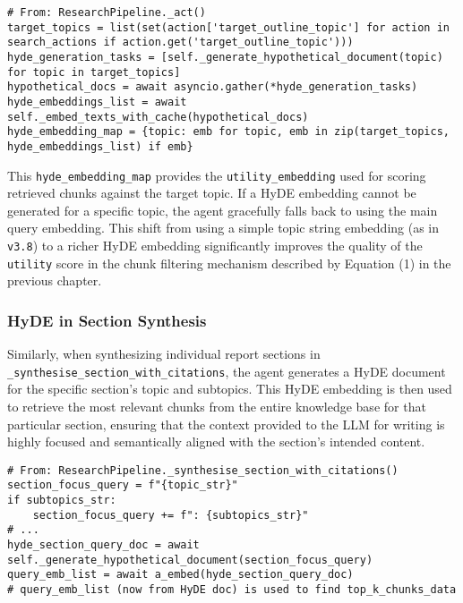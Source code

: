 \documentclass[12pt, a4paper]{article}
\begin{document}
\begin{lstlisting}[style=myPython]
# From: ResearchPipeline._act()
target_topics = list(set(action['target_outline_topic'] for action in search_actions if action.get('target_outline_topic')))
hyde_generation_tasks = [self._generate_hypothetical_document(topic) for topic in target_topics]
hypothetical_docs = await asyncio.gather(*hyde_generation_tasks)
hyde_embeddings_list = await self._embed_texts_with_cache(hypothetical_docs)
hyde_embedding_map = {topic: emb for topic, emb in zip(target_topics, hyde_embeddings_list) if emb}
\end{lstlisting}
This \verb|hyde_embedding_map| provides the \verb|utility_embedding| used for scoring retrieved chunks against the target topic. If a HyDE embedding cannot be generated for a specific topic, the agent gracefully falls back to using the main query embedding. This shift from using a simple topic string embedding (as in \verb|v3.8|) to a richer HyDE embedding significantly improves the quality of the \verb|utility| score in the chunk filtering mechanism described by Equation (1) in the previous chapter.

\subsubsection{HyDE in Section Synthesis}
Similarly, when synthesizing individual report sections in \verb|_synthesise_section_with_citations|, the agent generates a HyDE document for the specific section's topic and subtopics. This HyDE embedding is then used to retrieve the most relevant chunks from the entire knowledge base for that particular section, ensuring that the context provided to the LLM for writing is highly focused and semantically aligned with the section's intended content.

\begin{lstlisting}[style=myPython]
# From: ResearchPipeline._synthesise_section_with_citations()
section_focus_query = f"{topic_str}"
if subtopics_str:
    section_focus_query += f": {subtopics_str}"
# ...
hyde_section_query_doc = await self._generate_hypothetical_document(section_focus_query)
query_emb_list = await a_embed(hyde_section_query_doc)
# query_emb_list (now from HyDE doc) is used to find top_k_chunks_data
\end{lstlisting}
\end{document}
